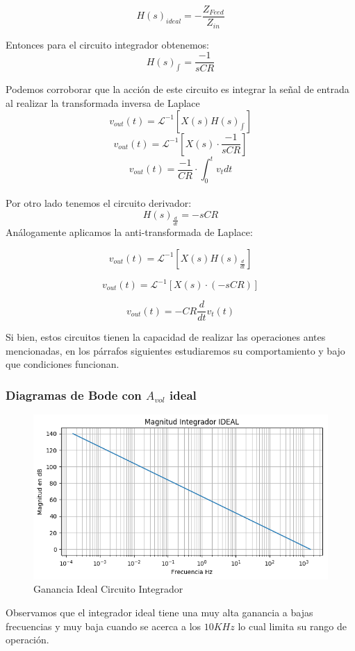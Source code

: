 $$H(s)_{ideal} =  -\frac{Z_{Feed}}{Z_{in}}$$

Entonces para el circuito integrador obtenemos:
$$H(s)_{\int_{}{}} = \frac{-1}{sCR} $$

Podemos corroborar que la acción de este circuito es integrar la señal de entrada al realizar la transformada inversa de Laplace
$$v_{out}(t) = \mathcal{L}^{-1}[X(s)H(s)_{\int_{}{}}]$$
$$v_{out}(t) = \mathcal{L}^{-1}[X(s)\cdot \frac{-1}{sCR}]$$
$$v_{out}(t)= \frac{-1}{CR} \cdot \int_{0}^{t}v_t dt$$            
\\
Por otro lado tenemos el circuito derivador:
$$H(s)_{\frac{d}{dt}}=-sCR$$
Análogamente aplicamos la anti-transformada de Laplace:

$$v_{out}(t) = \mathcal{L}^{-1}[X(s)H(s)_{\frac{d}{dt}}]$$

$$v_{out}(t) = \mathcal{L}^{-1}[X(s)\cdot (-sCR)]$$

$$v_{out}(t)= -CR \frac{d}{dt}v_t(t)$$       

Si bien, estos circuitos tienen la capacidad de realizar las operaciones antes mencionadas, en los párrafos siguientes estudiaremos su comportamiento y bajo que condiciones funcionan.

\subsubsection{Diagramas de Bode con $A_{vol}$ ideal}
\begin{figure}[H]
	\centering
	\includegraphics[width=\textwidth]{Ejercicio4/BODE-IDEAL-MAGNITUD-INTEGRADOR.png}
	\caption{Ganancia Ideal Circuito Integrador}
\end{figure}

Observamos que el integrador ideal tiene una muy alta ganancia a bajas frecuencias y muy baja cuando se acerca a los $10KHz$ lo cual limita su rango de operación.

